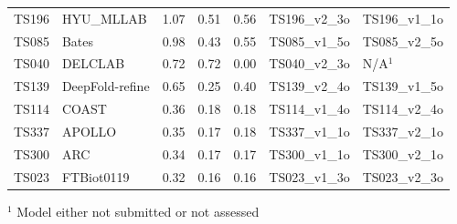 \begin{table}[ht]
{\begin{tabular}{llrrrll}
TS196 & HYU\_MLLAB & 1.07 & 0.51 & 0.56 & TS196\_v2\_3o & TS196\_v1\_1o \\ 
TS085 & Bates & 0.98 & 0.43 & 0.55 & TS085\_v1\_5o & TS085\_v2\_5o \\ 
TS040 & DELCLAB & 0.72 & 0.72 & 0.00 & TS040\_v2\_3o & N/A$^{1}$ \\ 
TS139 & DeepFold-refine & 0.65 & 0.25 & 0.40 & TS139\_v2\_4o & TS139\_v1\_5o \\ 
TS114 & COAST & 0.36 & 0.18 & 0.18 & TS114\_v1\_4o & TS114\_v2\_4o \\ 
TS337 & APOLLO & 0.35 & 0.17 & 0.18 & TS337\_v1\_1o & TS337\_v2\_1o \\ 
TS300 & ARC & 0.34 & 0.17 & 0.17 & TS300\_v1\_1o & TS300\_v2\_1o \\ 
TS023 & FTBiot0119 & 0.32 & 0.16 & 0.16 & TS023\_v1\_3o & TS023\_v2\_3o \\ 
\bottomrule
\end{tabular}%
}
\begin{flushleft}\footnotesize $^{1}$ Model either not submitted or not assessed\end{flushleft}
\end{table}
